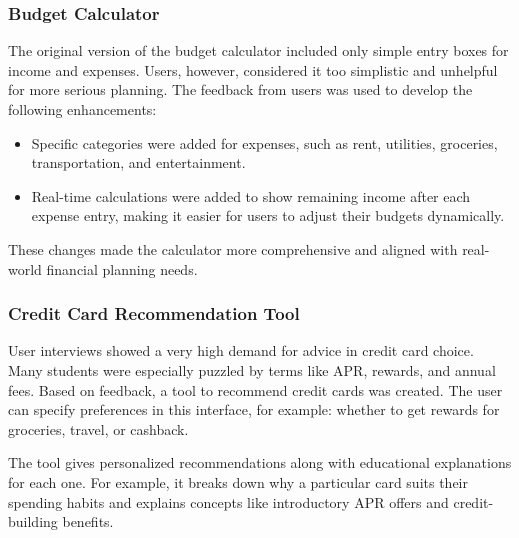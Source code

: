 \documentclass[11pt,twocolumn]{article}
\begin{document}
\subsubsection{Budget Calculator}
The original version of the budget calculator included only simple entry boxes for income and expenses. Users, however, considered it too simplistic and unhelpful for more serious planning. The feedback from users was used to develop the following enhancements:
\begin{itemize}
    \item Specific categories were added for expenses, such as rent, utilities, groceries, transportation, and entertainment.
    \item Real-time calculations were added to show remaining income after each expense entry, making it easier for users to adjust their budgets dynamically.
\end{itemize}

These changes made the calculator more comprehensive and aligned with real-world financial planning needs.

\subsubsection{Credit Card Recommendation Tool}
User interviews showed a very high demand for advice in credit card choice. Many students were especially puzzled by terms like APR, rewards, and annual fees. Based on feedback, a tool to recommend credit cards was created. The user can specify preferences in this interface, for example: whether to get rewards for groceries, travel, or cashback.

The tool gives personalized recommendations along with educational explanations for each one. For example, it breaks down why a particular card suits their spending habits and explains concepts like introductory APR offers and credit-building benefits.
\end{document}
